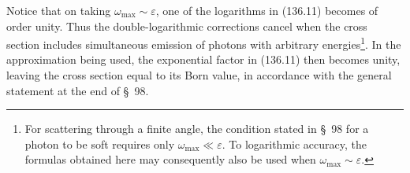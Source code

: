 Notice that on taking $\omega_{\max}\sim\varepsilon$, one of the logarithms in (136.11) becomes of order unity. Thus the double-logarithmic corrections cancel when the cross section includes simultaneous emission of photons with arbitrary energies\footnote{For scattering through a finite angle, the condition stated in \S~98 for a photon to be soft requires only $\omega_{\max}\ll\varepsilon$. To logarithmic accuracy, the formulas obtained here may consequently also be used when $\omega_{\max}\sim\varepsilon$.}. In the approximation being used, the exponential factor in (136.11) then becomes unity, leaving the cross section equal to its Born value, in accordance with the general statement at the end of \S~98.

